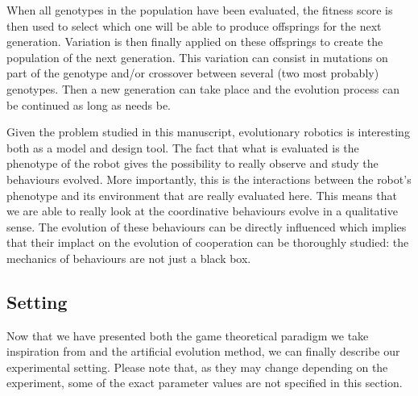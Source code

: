     When all genotypes in the population have been evaluated, the fitness score is then used to select which one will be able to produce offsprings for the next generation. Variation is then finally applied on these offsprings to create the population of the next generation. This variation can consist in mutations on part of the genotype and/or crossover between several (two most probably) genotypes. Then a new generation can take place and the evolution process can be continued as long as needs be.

    Given the problem studied in this manuscript, evolutionary robotics is interesting both as a model and design tool. The fact that what is evaluated is the phenotype of the robot gives the possibility to really observe and study the behaviours evolved. More importantly, this is the interactions between the robot's phenotype and its environment that are really evaluated here. This means that we are able to really look at the coordinative behaviours evolve in a qualitative sense. The evolution of these behaviours can be directly influenced which implies that their implact on the evolution of cooperation can be thoroughly studied: the mechanics of behaviours are not just a black box.




  \subsection{Setting} %

    Now that we have presented both the game theoretical paradigm we take inspiration from and the artificial evolution method, we can finally describe our experimental setting. Please note that, as they may change depending on the experiment, some of the exact parameter values are not specified in this section.

